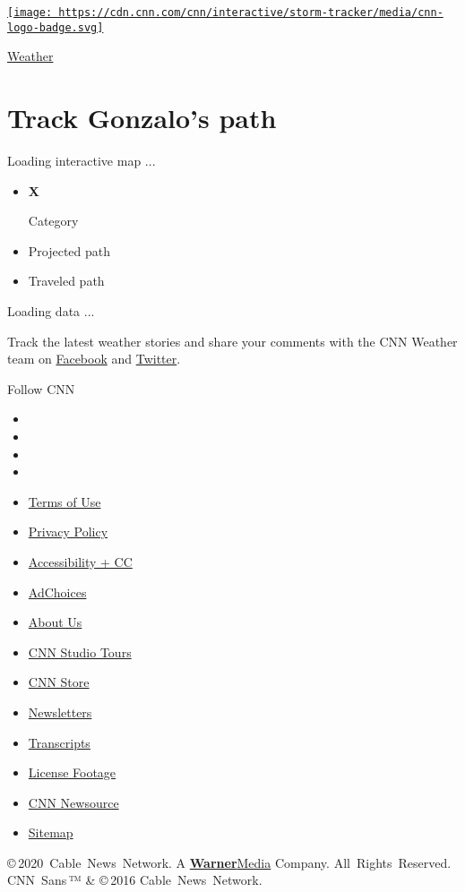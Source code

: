\href{https://cnn.com}{\texttt{[image: https://cdn.cnn.com/cnn/interactive/storm-tracker/media/cnn-logo-badge.svg]}}

\href{/weather}{Weather}

\hypertarget{track-gonzalos-path}{%
\section{Track Gonzalo's path}\label{track-gonzalos-path}}

Loading interactive map ...

\begin{itemize}
\item
  \textbf{X}

  Category
\item
  Projected path
\item
  Traveled path
\end{itemize}

Loading data ...

Track the latest weather stories and share your comments with the CNN
Weather team on \href{https://www.facebook.com/cnnweather/}{Facebook}
and \href{https://twitter.com/cnnweather}{Twitter}.

Follow CNN

\begin{itemize}
\item
\item
\item
\item
\end{itemize}

\begin{itemize}
\tightlist
\item
  \href{https://cnn.com/terms}{Terms of Use}
\item
  \href{https://cnn.com/privacy}{Privacy Policy}
\item
  \href{https://cnn.com/accessibility}{Accessibility + CC}
\item
  \href{https://preferences-mgr.truste.com/?pid=turnermedia01\&aid=turnermedia01\&type=turner_pop\&pid=turnermedia01\&aid=turnermedia01}{AdChoices}
\item
  \href{https://cnn.com/about}{About Us}
\item
  \href{https://tours.cnn.com}{CNN Studio Tours}
\item
  \href{https://store.cnn.com}{CNN Store}
\item
  \href{https://cnn.com/newsletters}{Newsletters}
\item
  \href{https://cnn.com/transcripts}{Transcripts}
\item
  \href{https://collection.cnn.com}{License Footage}
\item
  \href{https://cnnnewsource.com/}{CNN Newsource}
\item
  \href{https://www.cnn.com/sitemap.html}{Sitemap}
\end{itemize}

© 2020~Cable~News~Network. A
\href{https://warnermediagroup.com}{\textbf{Warner}Media} Company.
All~Rights~Reserved.\\
CNN~Sans ™ \& © 2016 Cable~News~Network. 
